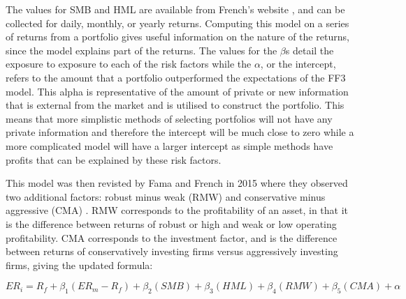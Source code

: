 The values for SMB and HML are available from French's website \cite{french_2022}, and can be collected for daily, monthly, or yearly returns. Computing this model on a series of returns from a portfolio gives useful information on the nature of the returns, since the model explains part of the returns. The values for the $\beta$s detail the exposure to exposure to each of the risk factors while the $\alpha$, or the intercept, refers to the amount that a portfolio outperformed the expectations of the FF3 model. This alpha is representative of the amount of private or new information that is external from the market and is utilised to construct the portfolio. This means that more simplistic methods of selecting portfolios will not have any private information and therefore the intercept will be much close to zero while a more complicated model will have a larger intercept as simple methods have profits that can be explained by these risk factors.

This model was then revisted by Fama and French in 2015 where they observed two additional factors: robust minus weak (RMW) and conservative minus aggressive (CMA) \cite{ff5}. RMW corresponds to the profitability of an asset, in that it is the difference between returns of robust or high and weak or low operating profitability. CMA corresponds to the investment factor, and is the difference between returns of conservatively investing firms versus aggressively investing firms, giving the updated formula:

\begin{equation}
ER_i = R_f + \beta_1(ER_m -R_f) + \beta_2 (SMB) + \beta_3(HML) + \beta_4(RMW) + \beta_5(CMA) + \alpha
\end{equation}




